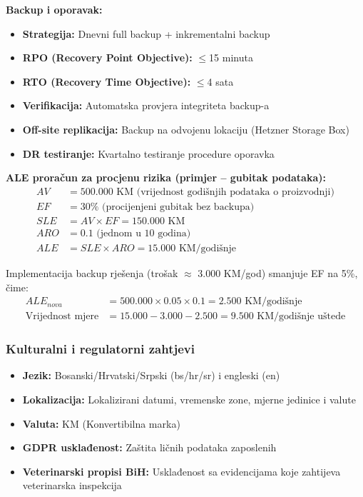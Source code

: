 \documentclass{article}
\begin{document}
\textbf{Backup i oporavak:}
\begin{itemize}
    \item \textbf{Strategija:} Dnevni full backup + inkrementalni backup
    \item \textbf{RPO (Recovery Point Objective):} $\leq$15 minuta
    \item \textbf{RTO (Recovery Time Objective):} $\leq$4 sata
    \item \textbf{Verifikacija:} Automatska provjera integriteta backup-a
    \item \textbf{Off-site replikacija:} Backup na odvojenu lokaciju (Hetzner Storage Box)
    \item \textbf{DR testiranje:} Kvartalno testiranje procedure oporavka
\end{itemize}

\textbf{ALE proračun za procjenu rizika (primjer -- gubitak podataka):}
\begin{align*}
    AV &= 500.000 \text{ KM (vrijednost godišnjih podataka o proizvodnji)} \\
    EF &= 30\% \text{ (procijenjeni gubitak bez backupa)} \\
    SLE &= AV \times EF = 150.000 \text{ KM} \\
    ARO &= 0.1 \text{ (jednom u 10 godina)} \\
    ALE &= SLE \times ARO = 15.000 \text{ KM/godišnje}
\end{align*}

Implementacija backup rješenja (trošak $\approx$ 3.000 KM/god) smanjuje EF na 5\%, čime:
\begin{align*}
    ALE_{nova} &= 500.000 \times 0.05 \times 0.1 = 2.500 \text{ KM/godišnje} \\
    \text{Vrijednost mjere} &= 15.000 - 3.000 - 2.500 = 9.500 \text{ KM/godišnje uštede}
\end{align*}

\subsubsection{Kulturalni i regulatorni zahtjevi}

\begin{itemize}
    \item \textbf{Jezik:} Bosanski/Hrvatski/Srpski (bs/hr/sr) i engleski (en)
    \item \textbf{Lokalizacija:} Lokalizirani datumi, vremenske zone, mjerne jedinice i valute
    \item \textbf{Valuta:} KM (Konvertibilna marka)
    \item \textbf{GDPR usklađenost:} Zaštita ličnih podataka zaposlenih
    \item \textbf{Veterinarski propisi BiH:} Usklađenost sa evidencijama koje zahtijeva veterinarska inspekcija
\end{itemize}
\end{document}
